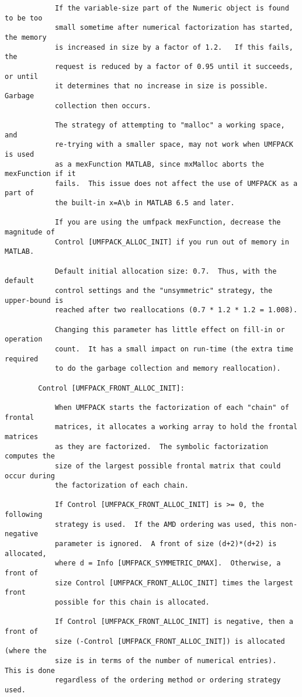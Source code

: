 \documentclass[11pt]{article}
\begin{document}
{\begin{verbatim}
            If the variable-size part of the Numeric object is found to be too
            small sometime after numerical factorization has started, the memory
            is increased in size by a factor of 1.2.   If this fails, the
            request is reduced by a factor of 0.95 until it succeeds, or until
            it determines that no increase in size is possible.  Garbage
            collection then occurs.

            The strategy of attempting to "malloc" a working space, and
            re-trying with a smaller space, may not work when UMFPACK is used
            as a mexFunction MATLAB, since mxMalloc aborts the mexFunction if it
            fails.  This issue does not affect the use of UMFPACK as a part of
            the built-in x=A\b in MATLAB 6.5 and later.

            If you are using the umfpack mexFunction, decrease the magnitude of
            Control [UMFPACK_ALLOC_INIT] if you run out of memory in MATLAB.

            Default initial allocation size: 0.7.  Thus, with the default
            control settings and the "unsymmetric" strategy, the upper-bound is
            reached after two reallocations (0.7 * 1.2 * 1.2 = 1.008).

            Changing this parameter has little effect on fill-in or operation
            count.  It has a small impact on run-time (the extra time required
            to do the garbage collection and memory reallocation).

        Control [UMFPACK_FRONT_ALLOC_INIT]:

            When UMFPACK starts the factorization of each "chain" of frontal
            matrices, it allocates a working array to hold the frontal matrices
            as they are factorized.  The symbolic factorization computes the
            size of the largest possible frontal matrix that could occur during
            the factorization of each chain.

            If Control [UMFPACK_FRONT_ALLOC_INIT] is >= 0, the following
            strategy is used.  If the AMD ordering was used, this non-negative
            parameter is ignored.  A front of size (d+2)*(d+2) is allocated,
            where d = Info [UMFPACK_SYMMETRIC_DMAX].  Otherwise, a front of
            size Control [UMFPACK_FRONT_ALLOC_INIT] times the largest front
            possible for this chain is allocated.

            If Control [UMFPACK_FRONT_ALLOC_INIT] is negative, then a front of
            size (-Control [UMFPACK_FRONT_ALLOC_INIT]) is allocated (where the
            size is in terms of the number of numerical entries).  This is done
            regardless of the ordering method or ordering strategy used.


\end{verbatim}}
\end{document}
